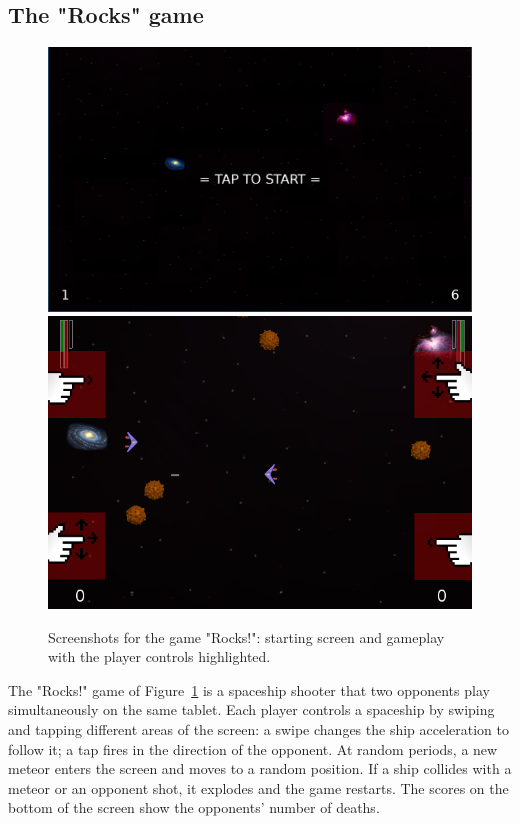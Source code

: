 \documentclass{sigplanconf}
\newcommand{\1}{\;}
\newcommand{\2}{\;\;}
\newcommand{\3}{\;\;\;}
\newcommand{\5}{\;\;\;\;\;}
\begin{document}

\subsection{The "Rocks" game}

\begin{figure}%
\centering
\includegraphics[scale=0.223]{screen-0.png}
\\
\includegraphics[scale=0.45]{screenshot.png}
\caption{
Screenshots for the game "Rocks!":
starting screen and gameplay with the player controls highlighted.
\label{fig.rocks}
}
\end{figure}

The "Rocks!" game of Figure~\ref{fig.rocks} is a spaceship shooter that two 
opponents play simultaneously on the same tablet.
Each player controls a spaceship by swiping and tapping different areas of the 
screen:
a swipe changes the ship acceleration to follow it;
a tap fires in the direction of the opponent.
At random periods, a new meteor enters the screen and moves to a random 
position.
If a ship collides with a meteor or an opponent shot, it explodes and the game 
restarts.
The scores on the bottom of the screen show the opponents' number of deaths.
\end{document}
